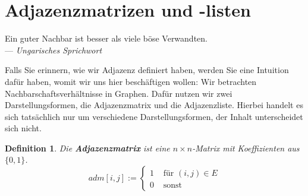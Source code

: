 \documentclass[11pt,a4paper]{scrartcl}
\newtheorem{definition}{Definition}
\begin{document}
\section{Adjazenzmatrizen und -listen}
\begin{flushright}
{\glqq}Ein guter Nachbar ist besser als viele böse Verwandten.{\grqq} \\
--- \textit{Ungarisches Sprichwort}
\end{flushright}
Falls Sie erinnern, wie wir Adjazenz definiert haben, werden Sie eine Intuition dafür haben, womit wir uns hier beschäftigen wollen: Wir betrachten Nachbarschaftsverhältnisse in Graphen. Dafür nutzen wir zwei Darstellungsformen, die Adjazenzmatrix und die Adjazenzliste. Hierbei handelt es sich tatsächlich nur um verschiedene Darstellungsformen, der Inhalt unterscheidet sich nicht.
\begin{definition}
Die \textbf{Adjazenzmatrix} ist eine $n \times n$-Matrix mit Koeffizienten aus $\{0, 1\}$.
\[ adm[i, j] := \begin{cases}1 & \text{ für } (i, j) \in E \\0 & \text{ sonst }\end{cases}\]
\end{definition}
\end{document}
